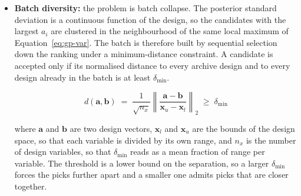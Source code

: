 \begin{itemize}
        \begin{equation}
        s_i \;=\; \max_{j \,\in\, \mathcal{G}_\mathrm{GP}}
        \left( \mu_{ij} + \kappa\,\sigma_{ij} \right)
        \label{eq:feas-margin}
        \end{equation}

        \noindent where $s_i$ is the margin score of candidate $i$ in the
        normalised constraint units of Equation~\eqref{eq:cv-norm},
        $\mathcal{G}_\mathrm{GP}$ is the set of constraints predicted by
        a surrogate, $\mu_{ij}$ and $\sigma_{ij}$ are the posterior mean
        and standard deviation of constraint $j$, and
        $\kappa = 1.5$ from Campaign 6. Candidates with $s_i \le 0$ are
        ranked first by $a_i$, and the others follow by ascending $s_i$,
        so the batch is always filled with the least risky designs. The
        construction is the deterministic counterpart of the
        probability-of-feasibility weighting~\cite{forrester_book_2008}
        and applies the rule of safe Bayesian optimisation, in which a
        point is admitted only where the confidence bound of every
        constraint is satisfied~\cite{sui_safeopt_2015}. Its effect
        on Campaign 6 is reported in Section~\ref{sec:res-c5-c7}.

  \item \textbf{Batch diversity:} the problem is batch collapse. The
        posterior standard deviation is a continuous function of the
        design, so the candidates with the largest $a_i$ are clustered
        in the neighbourhood of the same local maximum of
        Equation~\eqref{eq:gp-var}. The batch is therefore built by sequential
        selection down the ranking under a minimum-distance constraint.
        A candidate is accepted only if its normalised distance to
        every archive design and to every design already in the batch
        is at least $\delta_\mathrm{min}$.

        \begin{equation}
        d(\mathbf{a},\mathbf{b}) \;=\;
        \frac{1}{\sqrt{n_x}}
        \left\lVert \frac{\mathbf{a}-\mathbf{b}}
        {\mathbf{x}_u-\mathbf{x}_l} \right\rVert_2
        \;\ge\; \delta_\mathrm{min}
        \label{eq:batch-div}
        \end{equation}

        \noindent where $\mathbf{a}$ and $\mathbf{b}$ are two design
        vectors, $\mathbf{x}_l$ and $\mathbf{x}_u$ are the bounds of
        the design space, so that each variable is divided by its own
        range, and $n_x$ is the number of design variables, so that $\delta_\mathrm{min}$
        reads as a mean fraction of range per variable. The threshold
        is a lower bound on the separation, so a larger
        $\delta_\mathrm{min}$ forces the picks further apart and a
        smaller one admits picks that are closer together.


\end{itemize}
